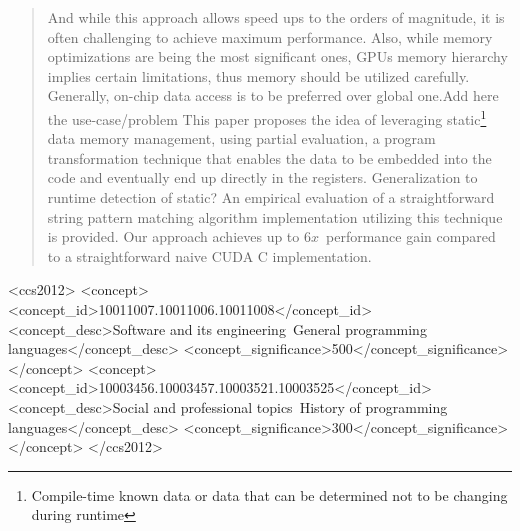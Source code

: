 \documentclass[sigplan,review,anonymous]{acmart}\settopmatter{printfolios=true,printccs=false,printacmref=false}
\newcommand\question[1]{{\color{violet}#1}}
\newcommand\todo[1]{{\color{red}#1}}
\begin{document}
\begin{abstract}
And while this approach allows speed ups to the orders of magnitude, it is often challenging to achieve maximum performance. Also, while memory optimizations are being the most significant ones, GPUs memory hierarchy implies certain limitations, thus memory should be utilized carefully. Generally, on-chip data access is to be preferred over global one.\todo{Add here the use-case/problem}
This paper proposes the idea of leveraging static\footnote{Compile-time known data or data that can be determined not to be changing during runtime} data memory management, using partial evaluation, a program transformation technique that enables the data to be embedded into the code and eventually end up directly in the registers. \question{Generalization to runtime detection of static?}
An empirical evaluation of a straightforward string pattern matching algorithm implementation \question{utilizing} this technique is provided.
\question{Our approach achieves up to $6x$\ performance gain compared to a straightforward naive CUDA C implementation.}  
\end{abstract}


\begin{CCSXML}
<ccs2012>
<concept>
<concept_id>10011007.10011006.10011008</concept_id>
<concept_desc>Software and its engineering~General programming languages</concept_desc>
<concept_significance>500</concept_significance>
</concept>
<concept>
<concept_id>10003456.10003457.10003521.10003525</concept_id>
<concept_desc>Social and professional topics~History of programming languages</concept_desc>
<concept_significance>300</concept_significance>
</concept>
</ccs2012>
\end{CCSXML}



\end{document}

